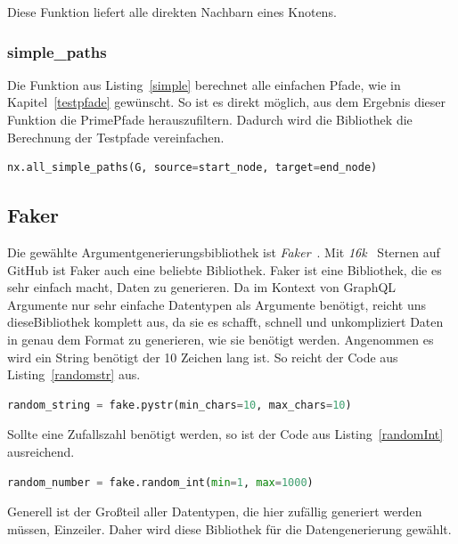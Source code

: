 Diese Funktion liefert alle direkten Nachbarn eines Knotens.

\subsubsection{simple\_paths}

Die Funktion aus Listing~\ref{simple} berechnet alle einfachen Pfade, wie in Kapitel~\ref{testpfade} gewünscht.
So ist es direkt möglich, aus dem Ergebnis dieser Funktion die PrimePfade herauszufiltern.
Dadurch wird die Bibliothek die Berechnung der Testpfade vereinfachen.

\begin{lstlisting}[language=Python, caption={Alle einfachen Pfade zwischen zwei Knoten}, label={simple}]
nx.all_simple_paths(G, source=start_node, target=end_node)
\end{lstlisting}

\subsection{Faker}
Die gewählte Argumentgenerierungsbibliothek ist \textit{Faker}~\cite{fakergithub}.
Mit \textit{16k}~\cite{fakergithub} Sternen auf GitHub ist Faker auch eine beliebte Bibliothek.
Faker ist eine Bibliothek, die es sehr einfach macht, Daten zu generieren.
Da im Kontext von GraphQL Argumente nur sehr einfache Datentypen als Argumente benötigt,
reicht uns dieseBibliothek komplett aus, da sie es schafft, schnell und unkompliziert Daten in genau dem Format zu generieren, wie sie benötigt werden.
Angenommen es wird ein String benötigt der 10 Zeichen lang ist.
So reicht der Code aus Listing~\ref{randomstr} aus.

\begin{lstlisting}[language=Python, caption={Ein zufälliger String}, label={randomstr}]
random_string = fake.pystr(min_chars=10, max_chars=10)
\end{lstlisting}

Sollte eine Zufallszahl benötigt werden, so ist der Code aus Listing~\ref{randomInt} ausreichend.

\begin{lstlisting}[language=Python, caption={Eine zufällige Zahl}, label={randomInt}]
random_number = fake.random_int(min=1, max=1000)
\end{lstlisting}

Generell ist der Großteil aller Datentypen, die hier zufällig generiert werden müssen, Einzeiler.
Daher wird diese Bibliothek für die Datengenerierung gewählt.

